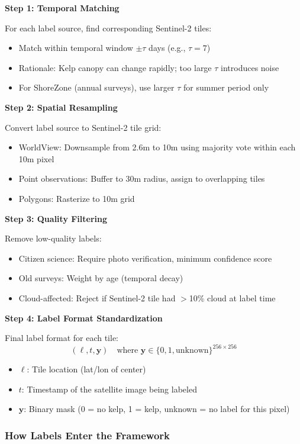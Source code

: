 \documentclass[11pt]{article}
\begin{document}
\textbf{Step 1: Temporal Matching}

For each label source, find corresponding Sentinel-2 tiles:
\begin{itemize}
    \item Match within temporal window $\pm \tau$ days (e.g., $\tau = 7$)
    \item Rationale: Kelp canopy can change rapidly; too large $\tau$ introduces noise
    \item For ShoreZone (annual surveys), use larger $\tau$ for summer period only
\end{itemize}

\textbf{Step 2: Spatial Resampling}

Convert label source to Sentinel-2 tile grid:
\begin{itemize}
    \item WorldView: Downsample from 2.6m to 10m using majority vote within each 10m pixel
    \item Point observations: Buffer to 30m radius, assign to overlapping tiles
    \item Polygons: Rasterize to 10m grid
\end{itemize}

\textbf{Step 3: Quality Filtering}

Remove low-quality labels:
\begin{itemize}
    \item Citizen science: Require photo verification, minimum confidence score
    \item Old surveys: Weight by age (temporal decay)
    \item Cloud-affected: Reject if Sentinel-2 tile had $>$10\% cloud at label time
\end{itemize}

\textbf{Step 4: Label Format Standardization}

Final label format for each tile:
\[
(\ell, t, \mathbf{y}) \quad \text{where } \mathbf{y} \in \{0, 1, \text{unknown}\}^{256 \times 256}
\]
\begin{itemize}
    \item $\ell$: Tile location (lat/lon of center)
    \item $t$: Timestamp of the satellite image being labeled
    \item $\mathbf{y}$: Binary mask (0 = no kelp, 1 = kelp, unknown = no label for this pixel)
\end{itemize}

\subsubsection{How Labels Enter the Framework}
\end{document}
